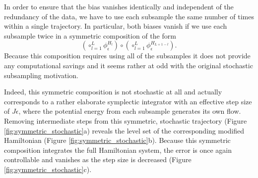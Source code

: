 \documentclass{article}
\begin{document}
In order to ensure that the bias vanishes identically and independent of the redundancy
of the data, we have to use each subsample the same number of times within a single 
trajectory.  In particular, both biases vanish if we use each subsample twice in a symmetric 
composition of the form
%
\begin{equation*}
\left( \circ_{l = 1}^{L} \phi^{H_{l}}_{\epsilon} \right)
\circ 
\left( \circ_{l = 1}^{L} \phi^{H_{L + 1 - l}}_{\epsilon} \right).
\end{equation*}
%
Because this composition requires using all of the subsamples it does not provide
any computational savings and it seems rather at odd with the original stochastic 
subsampling motivation. 

Indeed, this symmetric composition is not stochastic at all and actually corresponds 
to a rather elaborate symplectic integrator with an effective step size of $J \epsilon$, 
where the potential energy from each subsample generates its own flow.  Removing 
intermediate steps from this symmetric, stochastic trajectory 
(Figure \ref{fig:symmetric_stochastic}a) reveals the level set of the corresponding
modified Hamiltonian (Figure \ref{fig:symmetric_stochastic}b).  Because this
symmetric composition integrates the full Hamiltonian system, the error is 
once again controllable and vanishes as the step size is decreased
(Figure \ref{fig:symmetric_stochastic}c).
\end{document}
